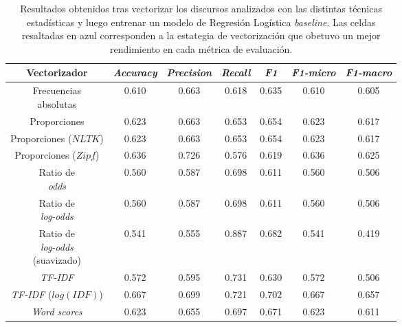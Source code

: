 \begin{table}[h!]
    \centering
    \begin{tabular}{ |c|c|c|c|c|c|c| }
        \hline
        Vectorizador & \textit{Accuracy} & \textit{Precision} & \textit{Recall} & \textit{F1} & \textit{F1-micro} & \textit{F1-macro} \\
        \hline\hline
        \makecell{Frecuencias\\absolutas} & 0.610 & 0.663 & 0.618 & 0.635 & 0.610 & 0.605 \\
        \hline
        Proporciones & 0.623 & 0.663 & 0.653 & 0.654 & 0.623 & 0.617 \\
        \hline
        \makecell{Proporciones\\($NLTK$)} & 0.623 & 0.663 & 0.653 & 0.654 & 0.623 & 0.617 \\
        \hline
        \makecell{Proporciones\\($Zipf$)} & 0.636 & \cellcolor{highlight-table!60}0.726 & 0.576 & 0.619 & 0.636 & 0.625 \\
        \hline
        \makecell{Ratio de\\\textit{odds}} & 0.560 & 0.587 & 0.698 & 0.611 & 0.560 & 0.506 \\
        \hline
        \makecell{Ratio de\\\textit{log-odds}} & 0.560 & 0.587 & 0.698 & 0.611 & 0.560 & 0.506 \\
        \hline
        \makecell{Ratio de\\\textit{log-odds}\\(suavizado)} & 0.541 & 0.555 & \cellcolor{highlight-table!60}0.887 & 0.682 & 0.541 & 0.419 \\
        \hline
        \textit{TF-IDF} & 0.572 & 0.595 & 0.731 & 0.630 & 0.572 & 0.506 \\
        \hline
        \makecell{\textit{TF-IDF}\\($log(IDF)$)} & \cellcolor{highlight-table!60}0.667 & 0.699 & 0.721 & \cellcolor{highlight-table!60}0.702 & \cellcolor{highlight-table!60}0.667 & \cellcolor{highlight-table!60}0.657 \\
        \hline
        \textit{Word scores} & 0.623 & 0.655 & 0.697 & 0.671 & 0.623 & 0.611 \\
        \hline
    \end{tabular}
    \caption{Resultados obtenidos tras vectorizar los discursos analizados
    con las distintas técnicas estadísticas y luego entrenar un modelo de
    Regresión Logística \textit{baseline}. Las celdas resaltadas en azul corresponden
    a la estategia de vectorización que obetuvo un mejor rendimiento en cada
    métrica de evaluación.}
    \label{table-methods-vectorizers}
\end{table}
